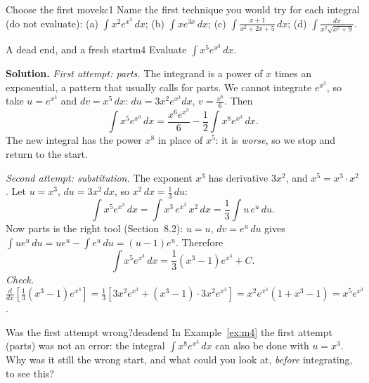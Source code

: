\documentclass[11pt]{article}
\begin{document}
\begin{kc}{Choose the first move}{kc1}
Name the first technique you would try for each integral (do not evaluate): (a) $\displaystyle\int x^2e^{x^3}\,dx$; (b) $\displaystyle\int xe^{3x}\,dx$; (c) $\displaystyle\int\frac{x+1}{x^2+2x+5}\,dx$; (d) $\displaystyle\int\frac{dx}{x^2\sqrt{x^2+9}}$.
\end{kc}

\begin{exmp}{A dead end, and a fresh start}{m4}
Evaluate $\displaystyle\int x^5e^{x^3}\,dx$.

\textbf{Solution.} \emph{First attempt: parts.} The integrand is a power of $x$ times an exponential, a pattern that usually calls for parts. We cannot integrate $e^{x^3}$, so take $u=e^{x^3}$ and $dv=x^5\,dx$: $du=3x^2e^{x^3}dx$, $v=\frac{x^6}6$. Then
\[\int x^5e^{x^3}\,dx=\frac{x^6e^{x^3}}6-\frac12\int x^8e^{x^3}\,dx .\]
The new integral has the power $x^8$ in place of $x^5$: it is \emph{worse}, so we stop and return to the start.

\emph{Second attempt: substitution.} The exponent $x^3$ has derivative $3x^2$, and $x^5=x^3\cdot x^2$. Let $u=x^3$, $du=3x^2\,dx$, so $x^2\,dx=\frac13\,du$:
\[\int x^5e^{x^3}\,dx=\int x^3\,e^{x^3}\,x^2\,dx=\frac13\int u\,e^u\,du .\]
Now parts is the right tool (Section~8.2): $u=u$, $dv=e^u\,du$ gives $\int ue^u\,du=ue^u-\int e^u\,du=(u-1)e^u$. Therefore
\[\int x^5e^{x^3}\,dx=\frac13\left(x^3-1\right)e^{x^3}+C .\]
\emph{Check.} $\frac d{dx}\left[\frac13(x^3-1)e^{x^3}\right]=\frac13\left[3x^2e^{x^3}+(x^3-1)\cdot3x^2e^{x^3}\right]=x^2e^{x^3}\left(1+x^3-1\right)=x^5e^{x^3}$.
\end{exmp}

\begin{think}{Was the first attempt wrong?}{deadend}
In Example~\ref{ex:m4} the first attempt (parts) was not an error: the integral $\int x^8e^{x^3}\,dx$ can also be done with $u=x^3$. Why was it still the wrong start, and what could you look at, \emph{before} integrating, to see this?
\end{think}
\end{document}
